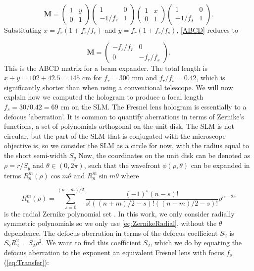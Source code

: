 \begin{equation}\label{ABCD}
	\mathbf{M}=
	\begin{pmatrix}
		1 & y \\
		0 & 1
	\end{pmatrix}
	\begin{pmatrix}
		1 & 0 \\
		-1/f_r & 1
	\end{pmatrix}
	\begin{pmatrix}
		1 & x \\
		0 & 1
	\end{pmatrix}
	\begin{pmatrix}
		1 & 0 \\
		-1/f_s & 1
	\end{pmatrix}.
\end{equation}
Substituting $x= f_r(1+f_s/f_r)$ and $y=f_r(1+f_r/f_s)$, \cref{ABCD} reduces to

\begin{equation}
	\mathbf{M}=
	\begin{pmatrix}
		-f_s/f_r & 0\\
		0 & -f_r/f_s
	\end{pmatrix}.
\end{equation}
This is the ABCD matrix for a beam expander. The total length is $x+y = 102 + 42.5 = 145$ cm for $f_r = 300$ mm and $f_r/f_s=0.42$, which is significantly shorter than when using a conventional telescope.
We will now explain how we computed the hologram to produce a focal length $f_s = 30 / 0.42 = 69$ cm on the SLM.
The Fresnel lens hologram is essentially to a defocus 'aberration'.
It is common to quantify aberrations in terms of Zernike's functions, a set of polynomials orthogonal on the unit disk. 
The SLM is not circular, but the part of the SLM that is conjugated with the microscope objective is, so we consider the SLM as a circle for now, with the radius equal to the short semi-width $S_y$
Now, the coordinates on the unit disk can be denoted as $\rho = r/S_y$ and $\theta \in (0, 2\pi)$, such that the wavefront $\phi(\rho,\theta)$ can be expanded in terms $R_n^m(\rho)\cos{m\theta}$ and $R_n^m\sin{m\theta}$ where 

\begin{equation}\label{eq:ZernikeRadial}
    R_{n}^{m}(\rho)=
    \sum_{s=0}^{(n-m) / 2}
    \frac{(-1)^{s}(n-s) !}{s !\left((n+m)/2-s\right) !\left((n-m)/2-s\right) !} \rho^{n-2 s}
\end{equation}
is the radial Zernike polynomial set \cite{Mahajan94}.
In this work, we only consider radially symmetric polynomials so we only use \cref{eq:ZernikeRadial}, without the $\theta$ dependence.
The defocus aberration in terms of the defocus coefficient $S_2$ is $S_2 R_2^2 = S_2\rho^2$.
We want to find this coefficient $S_2$, which we do by equating the defocus aberration to the exponent an equivalent Fresnel lens with focus $f_s$ (\cref{eq:Transfer}):

